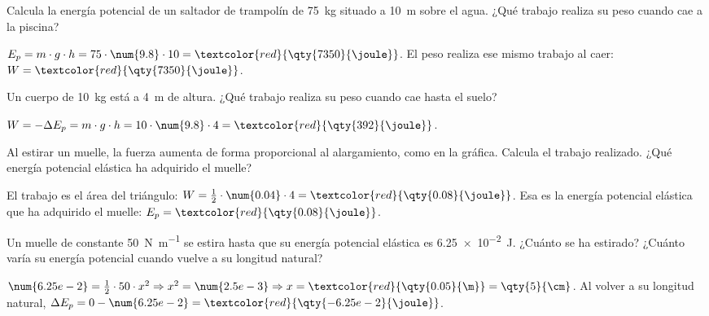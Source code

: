 \begin{exercise}
    Calcula la energía potencial de un saltador de trampolín de \qty{75}{\kg} situado a \qty{10}{\m} sobre el agua. ¿Qué trabajo realiza su peso cuando cae a la piscina?
    \begin{solu}
        \(E_p = m \cdot g \cdot h = 75 \cdot \num{9.8} \cdot 10 = \textcolor{red}{\qty{7350}{\joule}}\). El peso realiza ese mismo trabajo al caer: \(W = \textcolor{red}{\qty{7350}{\joule}}\).
    \end{solu}
\end{exercise}

\begin{exercise}
    Un cuerpo de \qty{10}{\kg} está a \qty{4}{\m} de altura. ¿Qué trabajo realiza su peso cuando cae hasta el suelo?
    \begin{solu}
        \(W = -\Delta E_p = m \cdot g \cdot h = 10 \cdot \num{9.8} \cdot 4 = \textcolor{red}{\qty{392}{\joule}}\).
    \end{solu}
\end{exercise}

\begin{exercise}
    Al estirar un muelle, la fuerza aumenta de forma proporcional al alargamiento, como en la gráfica. Calcula el trabajo realizado. ¿Qué energía potencial elástica ha adquirido el muelle?
    \begin{center}
    \end{center}
    \begin{solu}
        El trabajo es el área del triángulo: \(W = \frac{1}{2} \cdot \num{0.04} \cdot 4 = \textcolor{red}{\qty{0.08}{\joule}}\). Esa es la energía potencial elástica que ha adquirido el muelle: \(E_p = \textcolor{red}{\qty{0.08}{\joule}}\).
    \end{solu}
\end{exercise}

\begin{exercise}
    Un muelle de constante \qty{50}{\newton\per\m} se estira hasta que su energía potencial elástica es \qty{6.25e-2}{\joule}. ¿Cuánto se ha estirado? ¿Cuánto varía su energía potencial cuando vuelve a su longitud natural?
    \begin{solu}
        \(\num{6.25e-2} = \frac{1}{2} \cdot 50 \cdot x^2 \Rightarrow x^2 = \num{2.5e-3} \Rightarrow x = \textcolor{red}{\qty{0.05}{\m}} = \qty{5}{\cm}\).
        Al volver a su longitud natural, \(\Delta E_p = 0 - \num{6.25e-2} = \textcolor{red}{\qty{-6.25e-2}{\joule}}\).
    \end{solu}
\end{exercise}

